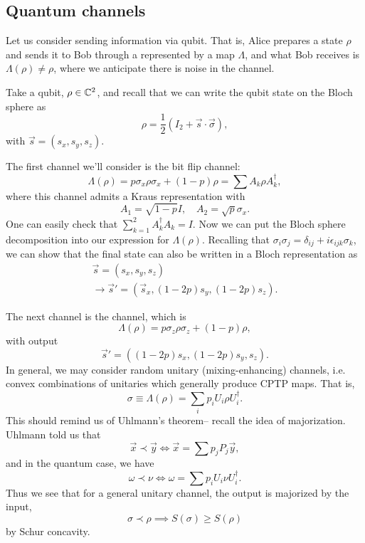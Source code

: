 \subsection*{Quantum channels}
Let us consider sending information via qubit. That is, Alice prepares a state $\rho$ and sends it to Bob through a  represented by a map $\Lambda$, and what Bob receives is $\Lambda(\rho)\neq \rho$, where we anticipate there is noise in the channel.

Take a qubit, $\rho\in \mathbb{C}^2$, and recall that we can write the qubit state on the Bloch sphere as
\begin{equation}
    \rho=\frac{1}{2}(I_2+ \vec s \cdot \vec \sigma),
\end{equation}
with $\vec s=(s_x,s_y,s_z)$.

The first channel we'll consider is the bit flip channel:
\begin{equation}
    \Lambda(\rho)= p \sigma_x \rho \sigma_x+(1-p)\rho =\sum A_k \rho A_k^\dagger,
\end{equation}
where this channel admits a Kraus representation with
\begin{equation}
    A_1=\sqrt{1-p}I,\quad A_2=\sqrt{p}\sigma_x.
\end{equation}
One can easily check that $\sum_{k=1}^2 A_k^\dagger A_k = I$. Now we can put the Bloch sphere decomposition into our expression for $\Lambda(\rho)$. Recalling that $\sigma_i \sigma_j = \delta_{ij} +i\epsilon_{ijk}\sigma_k$, we can show that the final state can also be written in a Bloch representation as
\begin{gather}
    \vec s=(s_x,s_y,s_z)\\
    \to \vec s' =(\vec s_x,(1-2p)s_y,(1-2p)s_z).
\end{gather}

The next channel is the  channel, which is
\begin{equation}
    \Lambda(\rho)=p\sigma_z \rho \sigma_z + (1-p) \rho,
\end{equation}
with output
\begin{equation}
    \vec s'=((1-2p)s_x,(1-2p)s_y,s_z).
\end{equation}
In general, we may consider random unitary (mixing-enhancing) channels, i.e. convex combinations of unitaries which generally produce CPTP maps. That is,
\begin{equation}
    \sigma \equiv \Lambda(\rho)=\sum_i p_i U_i \rho U_i^\dagger.
\end{equation}
This should remind us of Uhlmann's theorem-- recall the idea of majorization. Uhlmann told us that
\begin{equation}
    \vec x \prec \vec y \iff \vec x = \sum p_j P_j \vec y,
\end{equation}
and in the quantum case, we have
\begin{equation}
    \omega \prec \nu \iff \omega =\sum p_i U_i \nu U_i^\dagger.
\end{equation}
Thus we see that for a general unitary channel, the output is majorized by the input,
\begin{equation}
    \sigma \prec \rho \implies S(\sigma) \geq S(\rho)
\end{equation}
by Schur concavity.

